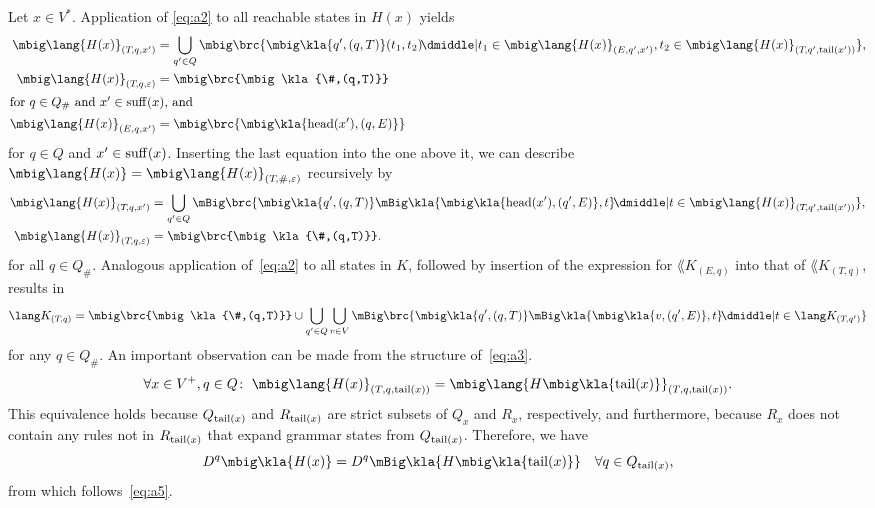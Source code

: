 Let $x\in V^*$. Application of \eqref{eq:a2} to all reachable states in $H(x)$ yields
\begin{align*}
 \mbig\lang{H(x)}_{(T\!,q,x')} &= \bigcup_{q'\in Q}\mbig\brc{\mbig\kla{q',(q,T)}(t_1,t_2) \!\dmiddle| t_1\in\mbig\lang{H(x)}_{(E,q',x')}, t_2\in\mbig\lang{H(x)}_{(T\!,q',\cdr(x'))}}, \\
 \mbig\lang{H(x)}_{(T\!,q,\eps)} &= \mbig\brc{\mbig\kla{\#,(q,T)}} \\
 \intertext{for $q\in Q_\#$ and $x'\in\suff(x)$, and}
 \mbig\lang{H(x)}_{(E,q,x')} &= \mbig\brc{\mbig\kla{\car(x'),(q,E)}}
\end{align*}
for $q\in Q$ and $x'\in\operatorname{suff}(x)$. Inserting the last equation into the one above it, we can describe $\mbig\lang{H(x)} = \mbig\lang{H(x)}_{(T\!,\#,\eps)}$ recursively by
\begin{subequations}\label{eq:a3}\begin{align}
 \mbig\lang{H(x)}_{(T\!,q,x')} &= \bigcup_{q'\in Q}\mBig\brc{\mbig\kla{q',(q,T)}\mBig\kla{\mbig\kla{\car(x'),(q',E)},t} \!\dmiddle| t\in\mbig\lang{H(x)}_{(T\!,q',\cdr(x'))}}, \label{eq:a3a} \\
 \mbig\lang{H(x)}_{(T\!,q,\eps)} &= \mbig\brc{\mbig\kla{\#,(q,T)}}. \label{eq:a3b}
\end{align}\end{subequations}
for all $q\in Q_\#$. Analogous application of~\eqref{eq:a2} to all states in
$K$, followed by insertion of the expression for $\lang K_{(E,q)}$ into that of
$\lang K_{(T\!,q)}$, results in
\begin{equation}\label{eq:a4}
 \lang K_{(T\!,q)} = \mbig\brc{\mbig\kla{\#,(q,T)}} \cup \bigcup_{q'\in Q}\bigcup_{v\in V}\mBig\brc{\mbig\kla{q',(q,T)}\mBig\kla{\mbig\kla{v,(q',E)},t} \!\dmiddle| t\in\lang K_{(T\!,q')}}
\end{equation}
for any $q\in Q_\#$. An important observation can be made from the structure of~\eqref{eq:a3}.
\begin{equation}\label{eq:a5}
 \forall x\in V^+, q\in Q\colon\;
 \mbig\lang{H(x)}_{(T,q,\cdr(x))} = \mbig\lang{H\mbig\kla{\cdr(x)}}_{(T,q,\cdr(x))}.
\end{equation}
This equivalence holds because $Q_{\operatorname{tail}(x)}$ and $R_{\operatorname{tail}(x)}$ are strict
subsets of $Q_x$ and $R_x$, respectively, and furthermore, because $R_x$ does
not contain any rules not in $R_{\operatorname{tail}(x)}$ that expand grammar states from
$Q_{\operatorname{tail}(x)}$. Therefore, we have
\[
 D^q\mbig\kla{H(x)} = D^q\mBig\kla{H\mbig\kla{\cdr(x)}} \quad\forall q\in Q_{\cdr(x)},
\]
from which follows~\eqref{eq:a5}.

